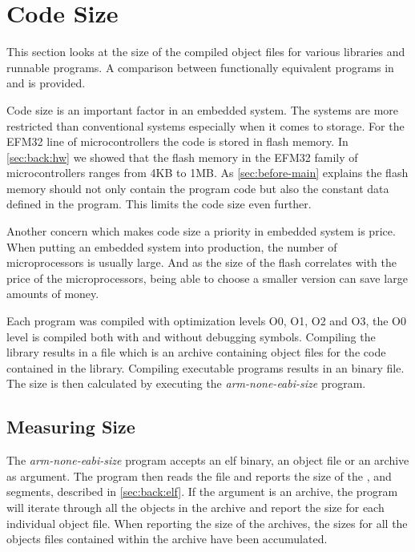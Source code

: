 \section{Code Size}

This section looks at the size of the compiled object files for various {\rust} libraries and runnable programs.
A comparison between functionally equivalent programs in {\C} and {\rust} is provided.

Code size is an important factor in an embedded system.
The systems are more restricted than conventional systems especially when it comes to storage.
For the EFM32 line of microcontrollers the code is stored in flash memory.
In \autoref{sec:back:hw} we showed that the flash memory in the EFM32 family of microcontrollers ranges from 4KB to 1MB.
As \autoref{sec:before-main} explains the flash memory should not only contain the program code but also the constant data defined in the program.
This limits the code size even further.

Another concern which makes code size a priority in embedded system is price.
When putting an embedded system into production, the number of microprocessors is usually large.
And as the size of the flash correlates with the price of the microprocessors, being able to choose a smaller version can save large amounts of money.

Each program was compiled with optimization levels O0, O1, O2 and O3, the O0 level is compiled both with and without debugging symbols.
Compiling the library results in a  file which is an archive containing object files for the code contained in the library.
Compiling executable programs results in an {\elf} binary file.
The size is then calculated by executing the \emph{arm-none-eabi-size} program.

\subsection{Measuring Size}
\label{sec:measure-size}

The \emph{arm-none-eabi-size} program accepts an elf binary, an object file or an archive as argument.
The program then reads the file and reports the size of the ,  and  segments, described in \autoref{sec:back:elf}.
If the argument is an archive, the program will iterate through all the objects in the archive and report the size for each individual object file.
When reporting the size of the archives, the sizes for all the objects files contained within the archive have been accumulated.

